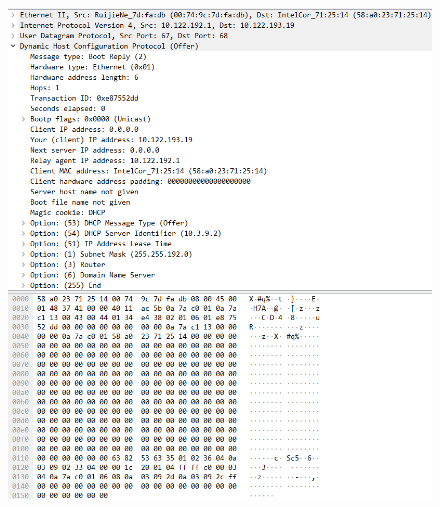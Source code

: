 \documentclass[lang=cn,11pt,a4paper,cite=authornum]{paper}
\begin{document}
\begin{figure}[htbp]
{\begin{minipage}[t]{0.45\linewidth}
            \includegraphics[width=\linewidth]{./Images/DHCP2.png}
        \end{minipage}
    }
    

\end{figure}
\end{document}
